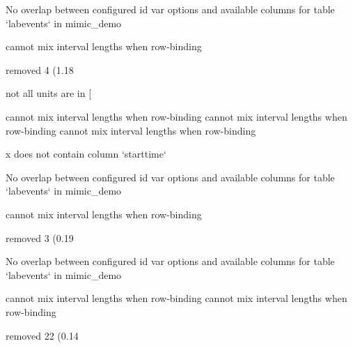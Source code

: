 \documentclass[
]{jss}
\begin{document}
\begin{CodeChunk}
\begin{CodeOutput}
No overlap between configured id var options and available columns for table
`labevents` in mimic_demo
\end{CodeOutput}

\begin{CodeOutput}
cannot mix interval lengths when row-binding
\end{CodeOutput}

\begin{CodeOutput}
removed 4 (1.18%
\end{CodeOutput}

\begin{CodeOutput}
not all units are in [%
\end{CodeOutput}

\begin{CodeOutput}
cannot mix interval lengths when row-binding
cannot mix interval lengths when row-binding
cannot mix interval lengths when row-binding
\end{CodeOutput}

\begin{CodeOutput}
x does not contain column `starttime`
\end{CodeOutput}

\begin{CodeOutput}
No overlap between configured id var options and available columns for table
`labevents` in mimic_demo
\end{CodeOutput}

\begin{CodeOutput}
cannot mix interval lengths when row-binding
\end{CodeOutput}

\begin{CodeOutput}
removed 3 (0.19%
\end{CodeOutput}

\begin{CodeOutput}
No overlap between configured id var options and available columns for table
`labevents` in mimic_demo
\end{CodeOutput}

\begin{CodeOutput}
cannot mix interval lengths when row-binding
cannot mix interval lengths when row-binding
\end{CodeOutput}

\begin{CodeOutput}
removed 22 (0.14%
\end{CodeOutput}


\end{CodeChunk}
\end{document}
